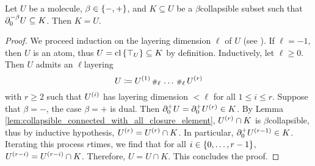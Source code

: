 \begin{lem} \label{lem:collapsible_negbeta_boundary_collapse_all}
    Let \( U \) be a molecule, \( \beta \in \set{-, +} \), and \( K \subseteq U \) be a \( \beta \)\nbd collapsible subset such that \( \bd{0}{-\beta} U \subseteq K \).
    Then \( K = U \).
\end{lem}
\begin{proof}
    We proceed induction on the layering dimension \( \ell \) of \( U \) (see \cite[Comment 4.2.13]{hadzihasanovic2024combinatorics}).
    If \( \ell = -1 \), then \( U \) is an atom, thus \( U = \clset{\top_U} \subseteq K \) by definition.
    Inductively, let \( \ell \geq 0 \). Then \( U \) admits an \( \ell \)\nbd layering
    \begin{equation*}
        U \eqdef \order{1}{U} \cp{\ell} \ldots \cp{\ell} \order{r}{U}
    \end{equation*}
    with \( r \geq 2 \) such that \( \order{i}{U} \) has layering dimension \( < \ell \) for all \( 1 \le i \le r \).
    Suppose that \( \beta = - \), the case \( \beta = + \) is dual.
    Then \( \bd{0}{+} U = \bd{0}{+} \order{r}{U} \in K \).
    By Lemma \ref{lem:collapsible_connected_with_all_closure_element}, \( \order{r}{U} \cap K \) is \( \beta \)\nbd collapsible, thus by inductive hypothesis, \( \order{r}{U} = \order{r}{U} \cap K \).
    In particular, \( \bd{0}{+} \order{r - 1}{U} \in K \).
    Iterating this process \( r \)\nbd times, we find that for all \( i \in \set{0, \ldots, r - 1} \), \( \order{r - i}{U} = \order{r - i}{U} \cap K \).
    Therefore, \( U = U \cap K \).
    This concludes the proof.
\end{proof}

